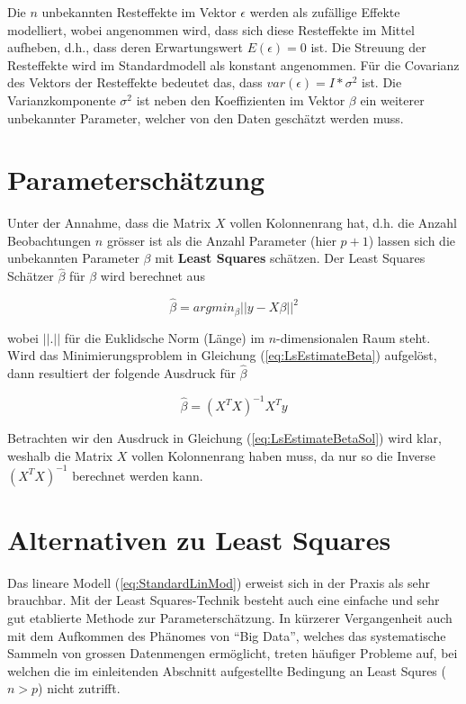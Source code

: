 \documentclass[]{book}
\begin{document}
Die \(n\) unbekannten Resteffekte im Vektor \(\epsilon\) werden als
zufällige Effekte modelliert, wobei angenommen wird, dass sich diese
Resteffekte im Mittel aufheben, d.h., dass deren Erwartungswert
\(E(\epsilon) = 0\) ist. Die Streuung der Resteffekte wird im
Standardmodell als konstant angenommen. Für die Covarianz des Vektors
der Resteffekte bedeutet das, dass \(var(\epsilon) = I*\sigma^2\) ist.
Die Varianzkomponente \(\sigma^2\) ist neben den Koeffizienten im Vektor
\(\beta\) ein weiterer unbekannter Parameter, welcher von den Daten
geschätzt werden muss.

\section{Parameterschätzung}\label{parameterschatzung}

Unter der Annahme, dass die Matrix \(X\) vollen Kolonnenrang hat, d.h.
die Anzahl Beobachtungen \(n\) grösser ist als die Anzahl Parameter
(hier \(p+1\)) lassen sich die unbekannten Parameter \(\beta\) mit
\textbf{Least Squares} schätzen. Der Least Squares Schätzer
\(\hat{\beta}\) für \(\beta\) wird berechnet aus

\begin{equation}
\hat{\beta} = argmin_{\beta}||y - X\beta||^2
\label{eq:LsEstimateBeta}
\end{equation}

wobei \(||.||\) für die Euklidsche Norm (Länge) im \(n\)-dimensionalen
Raum steht. Wird das Minimierungsproblem in Gleichung
(\ref{eq:LsEstimateBeta}) aufgelöst, dann resultiert der folgende
Ausdruck für \(\hat{\beta}\)

\begin{equation}
\hat{\beta} = (X^TX)^{-1}X^Ty
\label{eq:LsEstimateBetaSol}
\end{equation}

Betrachten wir den Ausdruck in Gleichung (\ref{eq:LsEstimateBetaSol})
wird klar, weshalb die Matrix \(X\) vollen Kolonnenrang haben muss, da
nur so die Inverse \((X^TX)^{-1}\) berechnet werden kann.

\section{Alternativen zu Least
Squares}\label{alternativen-zu-least-squares}

Das lineare Modell (\ref{eq:StandardLinMod}) erweist sich in der Praxis
als sehr brauchbar. Mit der Least Squares-Technik besteht auch eine
einfache und sehr gut etablierte Methode zur Parameterschätzung. In
kürzerer Vergangenheit auch mit dem Aufkommen des Phänomes von ``Big
Data'', welches das systematische Sammeln von grossen Datenmengen
ermöglicht, treten häufiger Probleme auf, bei welchen die im
einleitenden Abschnitt aufgestellte Bedingung an Least Squres
(\(n > p\)) nicht zutrifft.
\end{document}
